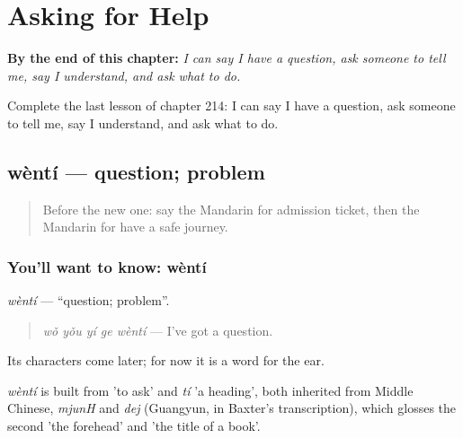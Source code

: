 
\chapter{Asking for Help}
\label{ch:zh-asking-for-help}

\begin{chapteropening}
\textbf{By the end of this chapter:} \emph{I can say I have a question, ask someone to tell me, say I understand, and ask what to do.}

Complete the last lesson of chapter 214: I can say I have a question, ask someone to tell me, say I understand, and ask what to do.
\end{chapteropening}

\section[wèntí]{wèntí — question; problem}

\label{lesson:ZH-C214-wenti}



\begin{quote}
Before the new one: say the Mandarin for admission ticket, then the Mandarin for have a safe journey.
\end{quote}

\subsection*{You'll want to know: wèntí}
\emph{wèntí} — \textquotedblleft{}question; problem\textquotedblright{}.

\begin{quote}
\emph{wǒ yǒu yí ge wèntí} — I've got a question.
\end{quote}

Its characters come later; for now it is a word for the ear.

\begin{cousinweb}
\emph{wèntí} is built from  'to ask' and \emph{tí} 'a heading', both inherited from Middle Chinese, \emph{mjunH} and \emph{dej} (Guangyun, in Baxter's transcription), which glosses the second 'the forehead' and 'the title of a book'.
\end{cousinweb}


